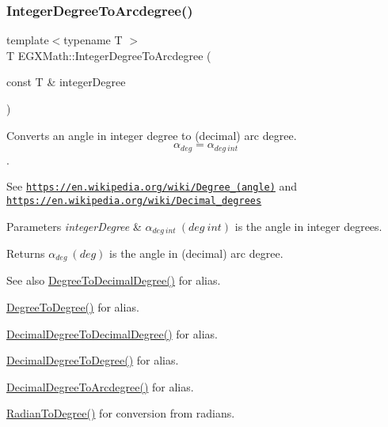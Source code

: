 \subsubsection{\texorpdfstring{Integer\+Degree\+To\+Arcdegree()}{IntegerDegreeToArcdegree()}}
{\footnotesize\ttfamily template$<$typename T $>$ \\
T E\+G\+X\+Math\+::\+Integer\+Degree\+To\+Arcdegree (\begin{DoxyParamCaption}\item[{const T \&}]{integer\+Degree }\end{DoxyParamCaption})}



Converts an angle in integer degree to (decimal) arc degree. \[\alpha_{deg}=\alpha_{deg\ int}\]. 

See \href{https://en.wikipedia.org/wiki/Degree_(angle)}{\tt https\+://en.\+wikipedia.\+org/wiki/\+Degree\+\_\+(angle)} and \href{https://en.wikipedia.org/wiki/Decimal_degrees}{\tt https\+://en.\+wikipedia.\+org/wiki/\+Decimal\+\_\+degrees} 
\begin{DoxyParams}{Parameters}
{\em integer\+Degree} & $\alpha_{deg\ int}\ (deg\ int)$ is the angle in integer degrees. \\
\hline
\end{DoxyParams}
\begin{DoxyReturn}{Returns}
$\alpha_{deg}\ (deg)$ is the angle in (decimal) arc degree. 
\end{DoxyReturn}
\begin{DoxySeeAlso}{See also}
\mbox{\hyperlink{group___e_g_x_math-_angle_conversions-_degree_ga568afc1d436d425bf5d4edea584aee08}{Degree\+To\+Decimal\+Degree()}} for alias. 

\mbox{\hyperlink{group___e_g_x_math-_angle_conversions-_degree_gaca157e7d3e99a46a11a04b92680d2574}{Degree\+To\+Degree()}} for alias. 

\mbox{\hyperlink{group___e_g_x_math-_angle_conversions-_decimal_degree_gafccf9cd779903872887978ab9d79661f}{Decimal\+Degree\+To\+Decimal\+Degree()}} for alias. 

\mbox{\hyperlink{group___e_g_x_math-_angle_conversions-_decimal_degree_ga0aa7f2f5dbb00cf4ab303421c6e33ccf}{Decimal\+Degree\+To\+Degree()}} for alias. 

\mbox{\hyperlink{group___e_g_x_math-_angle_conversions-_decimal_degree_gacdd463fcabffeb598ebda65b012ce743}{Decimal\+Degree\+To\+Arcdegree()}} for alias. 

\mbox{\hyperlink{group___e_g_x_math-_angle_conversions-_radian_ga25bbce6cdc1c3621f2a158d320e3bc45}{Radian\+To\+Degree()}} for conversion from radians. 
\end{DoxySeeAlso}
\mbox{\label{group___e_g_x_math-_angle_conversions-_integer_degree_ga78b014e7649d666a3647c467e64e4fe8}} 
